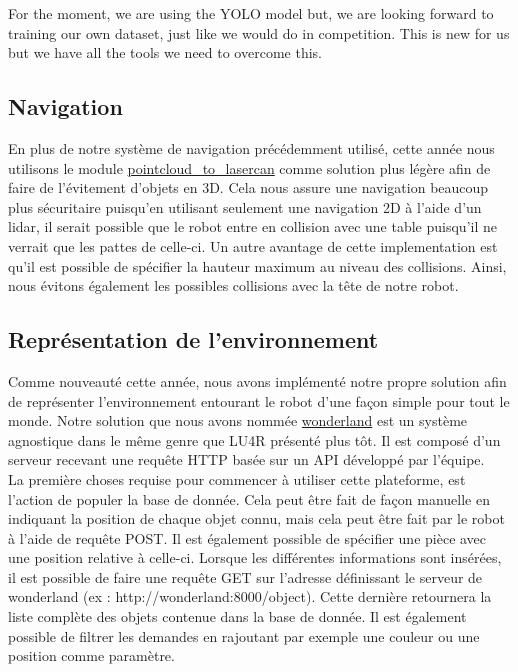 \documentclass[runningheads,a4paper]{llncs}
\begin{document}
For the moment, we are using the YOLO model but, we are looking forward to training our own dataset, just like we would do in competition. This is new for us but we have all the tools we need to overcome this. \\

\subsection{Navigation}
En plus de notre système de navigation précédemment utilisé, cette année nous utilisons le module \href{http://wiki.ros.org/pointcloud_to_laserscan}{pointcloud\_to\_lasercan} comme solution plus légère afin de faire de l'évitement d'objets en 3D. Cela nous assure une navigation beaucoup plus sécuritaire puisqu'en utilisant seulement une navigation 2D à l'aide d'un lidar, il serait possible que le robot entre en collision avec une table puisqu'il ne verrait que les pattes de celle-ci. Un autre avantage de cette implementation est qu'il est possible de spécifier la hauteur maximum au niveau des collisions. Ainsi, nous évitons également les possibles collisions avec la tête de notre robot. \\

\subsection{Représentation de l'environnement}
Comme nouveauté cette année, nous avons implémenté notre propre solution afin de représenter l'environnement entourant le robot d'une façon simple pour tout le monde. Notre solution que nous avons nommée \href{http://github.com/walkingmachine/wonderland}{wonderland} est un système agnostique dans le même genre que LU4R présenté plus tôt. Il est composé d'un serveur recevant une requête HTTP basée sur un API développé par l'équipe.\\

La première choses requise pour commencer à utiliser cette plateforme, est l'action de populer la base de donnée. Cela peut être fait de façon manuelle en indiquant la position de chaque objet connu, mais cela peut être fait par le robot à l'aide de requête POST. Il est également possible de spécifier une pièce avec une position relative à celle-ci. Lorsque les différentes informations sont insérées, il est possible de faire une requête GET sur l'adresse définissant le serveur de wonderland (ex : http://wonderland:8000/object). Cette dernière retournera la liste complète des objets contenue dans la base de donnée. Il est également possible de filtrer les demandes en rajoutant par exemple une couleur ou une position comme paramètre. \\
\end{document}
